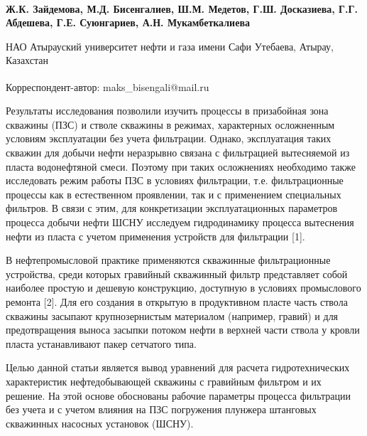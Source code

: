 
\begin{articleheader}

{\bfseries
Ж.К. Зайдемова,
М.Д. Бисенгалиев\textsuperscript{\envelope },
Ш.М. Медетов,
Г.Ш. Досказиева,
Г.Г. Абдешева,
Г.Е. Суюнгариев,
А.Н. Мукамбеткалиева
}
\end{articleheader}

\begin{affiliation}
НАО Атырауский университет нефти и газа имени Сафи Утебаева, Атырау, Казахстан

\raggedright \textsuperscript{\envelope }Корреспондент-автор: maks\_bisengali@mail.ru
\end{affiliation}

Результаты исследования позволили изучить процессы в призабойная зона
скважины (ПЗС) и стволе скважины в режимах, характерных осложненным
условиям эксплуатации без учета фильтрации. Однако, эксплуатация таких
скважин для добычи нефти неразрывно связана с фильтрацией вытесняемой из
пласта водонефтяной смеси. Поэтому при таких осложнениях необходимо
также исследовать режим работы ПЗС в условиях фильтрации, т.е.
фильтрационные процессы как в естественном проявлении, так и с
применением специальных фильтров. В связи с этим, для конкретизации
эксплуатационных параметров процесса добычи нефти ШСНУ исследуем
гидродинамику процесса вытеснения нефти из пласта с учетом применения
устройств для фильтрации {[}1{]}.

В нефтепромысловой практике применяются скважинные фильтрационные
устройства, среди которых гравийный скважинный фильтр представляет собой
наиболее простую и дешевую конструкцию, доступную в условиях
промыслового ремонта {[}2{]}. Для его создания в открытую в продуктивном
пласте часть ствола скважины засыпают крупнозернистым материалом
(например, гравий) и для предотвращения выноса засыпки потоком нефти в
верхней части ствола у кровли пласта устанавливают пакер сетчатого типа.

Целью данной статьи является вывод уравнений для расчета
гидротехнических характеристик нефтедобывающей скважины с гравийным
фильтром и их решение. На этой основе обоснованы рабочие параметры
процесса фильтрации без учета и с учетом влияния на ПЗС погружения
плунжера штанговых скважинных насосных установок (ШСНУ).

